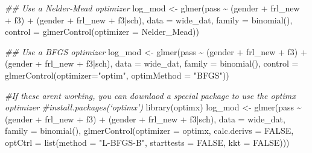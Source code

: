 \documentclass[
  letterpaper,
  DIV=11,
  numbers=noendperiod]{scrreprt}
\newenvironment{Shaded}{\begin{snugshade}}{\end{snugshade}}
\newcommand{\AttributeTok}[1]{\textcolor[rgb]{0.49,0.56,0.16}{#1}}
\newcommand{\CommentTok}[1]{\textcolor[rgb]{0.38,0.63,0.69}{\textit{#1}}}
\newcommand{\ConstantTok}[1]{\textcolor[rgb]{0.53,0.00,0.00}{#1}}
\newcommand{\DocumentationTok}[1]{\textcolor[rgb]{0.73,0.13,0.13}{\textit{#1}}}
\newcommand{\FunctionTok}[1]{\textcolor[rgb]{0.02,0.16,0.49}{#1}}
\newcommand{\NormalTok}[1]{\textcolor[rgb]{0.00,0.44,0.13}{#1}}
\newcommand{\OtherTok}[1]{\textcolor[rgb]{0.00,0.44,0.13}{#1}}
\newcommand{\SpecialCharTok}[1]{\textcolor[rgb]{0.25,0.44,0.63}{#1}}
\newcommand{\StringTok}[1]{\textcolor[rgb]{0.25,0.44,0.63}{#1}}
\begin{document}
\begin{Shaded}
\begin{Highlighting}[]
\DocumentationTok{\#\# Use a Nelder{-}Mead optimizer}
\NormalTok{log\_mod }\OtherTok{\textless{}{-}} \FunctionTok{glmer}\NormalTok{(pass }\SpecialCharTok{\textasciitilde{}}\NormalTok{ (gender }\SpecialCharTok{+}\NormalTok{ frl\_new }\SpecialCharTok{+}\NormalTok{ f3) }\SpecialCharTok{+} 
\NormalTok{                   (gender }\SpecialCharTok{+}\NormalTok{ frl\_new }\SpecialCharTok{+}\NormalTok{ f3}\SpecialCharTok{|}\NormalTok{sch), }
                 \AttributeTok{data =}\NormalTok{ wide\_dat, }\AttributeTok{family =} \FunctionTok{binomial}\NormalTok{(),}
                 \AttributeTok{control =} \FunctionTok{glmerControl}\NormalTok{(}\AttributeTok{optimizer =} \StringTok{\textquotesingle{}Nelder\_Mead\textquotesingle{}}\NormalTok{))}

\DocumentationTok{\#\# Use a BFGS optimizer }
\NormalTok{log\_mod }\OtherTok{\textless{}{-}} \FunctionTok{glmer}\NormalTok{(pass }\SpecialCharTok{\textasciitilde{}}\NormalTok{ (gender }\SpecialCharTok{+}\NormalTok{ frl\_new }\SpecialCharTok{+}\NormalTok{ f3) }\SpecialCharTok{+} 
\NormalTok{                   (gender }\SpecialCharTok{+}\NormalTok{ frl\_new }\SpecialCharTok{+}\NormalTok{ f3}\SpecialCharTok{|}\NormalTok{sch), }
                 \AttributeTok{data =}\NormalTok{ wide\_dat, }\AttributeTok{family =} \FunctionTok{binomial}\NormalTok{(),}
                 \AttributeTok{control =} \FunctionTok{glmerControl}\NormalTok{(}\AttributeTok{optimizer=}\StringTok{"optim"}\NormalTok{, }\AttributeTok{optimMethod =} \StringTok{"BFGS"}\NormalTok{))}

\CommentTok{\#If these aren\textquotesingle{}t working, you can downlaod a special package to use the optimx optimizer}
\CommentTok{\#install.packages(‘optimx’)}
\FunctionTok{library}\NormalTok{(optimx)}
\NormalTok{log\_mod }\OtherTok{\textless{}{-}} \FunctionTok{glmer}\NormalTok{(pass }\SpecialCharTok{\textasciitilde{}}\NormalTok{ (gender }\SpecialCharTok{+}\NormalTok{ frl\_new }\SpecialCharTok{+}\NormalTok{ f3) }\SpecialCharTok{+} 
\NormalTok{                   (gender }\SpecialCharTok{+}\NormalTok{ frl\_new }\SpecialCharTok{+}\NormalTok{ f3}\SpecialCharTok{|}\NormalTok{sch), }
                 \AttributeTok{data =}\NormalTok{ wide\_dat, }\AttributeTok{family =} \FunctionTok{binomial}\NormalTok{(),}
                 \FunctionTok{glmerControl}\NormalTok{(}\AttributeTok{optimizer =} \StringTok{\textquotesingle{}optimx\textquotesingle{}}\NormalTok{, }\AttributeTok{calc.derivs =} \ConstantTok{FALSE}\NormalTok{,}
                              \AttributeTok{optCtrl =} \FunctionTok{list}\NormalTok{(}\AttributeTok{method =} \StringTok{"L{-}BFGS{-}B"}\NormalTok{, }
                                             \AttributeTok{starttests =} \ConstantTok{FALSE}\NormalTok{, }
                                             \AttributeTok{kkt =} \ConstantTok{FALSE}\NormalTok{)))}
\end{Highlighting}
\end{Shaded}
\end{document}
